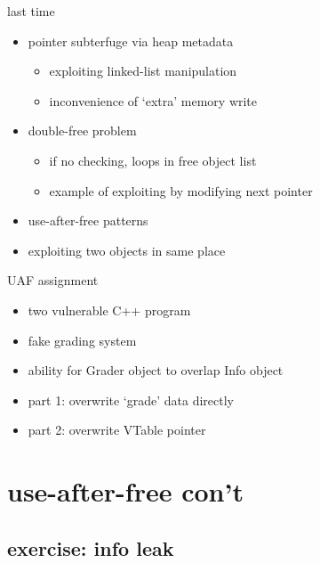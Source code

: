 \date{}
\title{}
\usepackage[outputdir=latex.out]{minted}

\begin{frame}
    \titlepage
\end{frame}



\begin{frame}{last time}
    \begin{itemize}
    \item pointer subterfuge via heap metadata
        \begin{itemize}
        \item exploiting linked-list manipulation
        \item inconvenience of `extra' memory write
        \end{itemize}
    \item double-free problem
        \begin{itemize}
        \item if no checking, loops in free object list
        \item example of exploiting by modifying next pointer
        \end{itemize}
    \item use-after-free patterns
    \item exploiting two objects in same place
    \end{itemize}
\end{frame}

\begin{frame}{UAF assignment}
    \begin{itemize}
    \item two vulnerable C++ program
    \item fake grading system
    \item ability for Grader object to overlap Info object
    \item part 1: overwrite `grade' data directly
    \item part 2: overwrite VTable pointer
    \end{itemize}
\end{frame}

\section{use-after-free con't}
\subsection{exercise: info leak}


